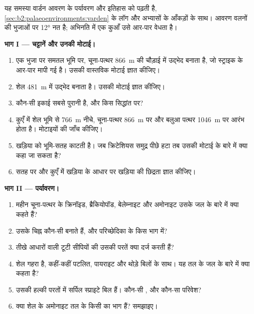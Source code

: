 \begin{problem}[{सप्ताहांत समस्या --- वार्डन पहाड़ियों का जुरैसिक समुद्र}]\label{pb:b2:palaeoenvironments:1}
यह समस्या वार्डन आवरण के पर्यावरण और इतिहास को पढ़ती है, \cref{sec:b2:palaeoenvironments:varden}
के लॉग और अभ्यासों के आँकड़ों के साथ। आवरण वलनों की भुजाओं पर
\ang{12} नत है; अभिनति में एक कुआँ उसे आर-पार वेधता है।

\medskip\noindent\textbf{भाग I --- चट्टानें और उनकी मोटाई।}
\begin{enumerate}
  \item एक भुजा पर समतल भूमि पर, चूना-पत्थर \qty{866}{m} की चौड़ाई में उद्भेद बनाता है, जो
        स्ट्राइक के आर-पार मापी गई है। उसकी वास्तविक मोटाई ज्ञात कीजिए।
  \item शेल \qty{481}{m} में उद्भेद बनाता है। उसकी मोटाई ज्ञात कीजिए।
  \item कौन-सी इकाई सबसे पुरानी है, और किस सिद्धांत पर?
  \item कुएँ में शेल भूमि से \qty{766}{m} नीचे, चूना-पत्थर \qty{866}{m} पर और
        बलुआ पत्थर \qty{1046}{m} पर आरंभ होता है। मोटाइयों की जाँच कीजिए।
  \item खड़िया को भूमि-सतह काटती है। जब क्रिटेशियस समुद्र पीछे हटा तब उसकी मोटाई के बारे में
        क्या कहा जा सकता है?
  \item सतह पर और कुएँ में खड़िया के आधार पर खड़िया की छिद्रता ज्ञात कीजिए।
\end{enumerate}

\medskip\noindent\textbf{भाग II --- पर्यावरण।}
\begin{enumerate}[resume]
  \item महीन चूना-पत्थर के क्रिनॉइड, ब्रैकियोपॉड, बेलेम्नाइट और अमोनाइट उसके जल के बारे में
        क्या कहते हैं?
  \item उसके चिह्न कौन-सी  बनाते हैं, और परिच्छेदिका के किस भाग में?
  \item तीखे आधारों वाली टूटी सीपियों की उसकी परतें क्या दर्ज करती हैं?
  \item शेल गहरा है, कहीं-कहीं पटलित, पायराइट और थोड़े बिलों के साथ। यह तल के जल के बारे में
        क्या कहता है?
  \item उसकी हल्की परतों में सर्पिल स्प्राइटे बिल हैं। कौन-सी , और कौन-सा परिवेश?
  \item क्या शेल के अमोनाइट तल के किसी  का भाग हैं? समझाइए।
\end{enumerate}


\end{problem}
